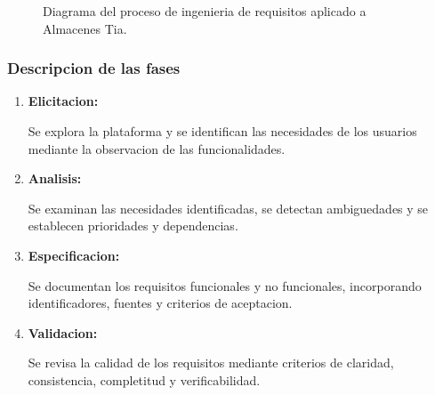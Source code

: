 \documentclass[12pt,a4paper]{article}
\begin{document}
\begin{figure}[H]
{
}

\shorthandon{>}

\caption{Diagrama del proceso de ingenieria de
requisitos aplicado a Almacenes Tia.}
\label{fig:proceso-requisitos}
\end{figure}

\subsubsection{Descripcion de las fases}

\begin{enumerate}

    \item \textbf{Elicitacion:}

    Se explora la plataforma y se identifican
    las necesidades de los usuarios mediante
    la observacion de las funcionalidades.

    \item \textbf{Analisis:}

    Se examinan las necesidades identificadas,
    se detectan ambiguedades y se establecen
    prioridades y dependencias.

    \item \textbf{Especificacion:}

    Se documentan los requisitos funcionales
    y no funcionales, incorporando identificadores,
    fuentes y criterios de aceptacion.

    \item \textbf{Validacion:}

    Se revisa la calidad de los requisitos mediante
    criterios de claridad, consistencia,
    completitud y verificabilidad.

\end{enumerate}
\end{document}
